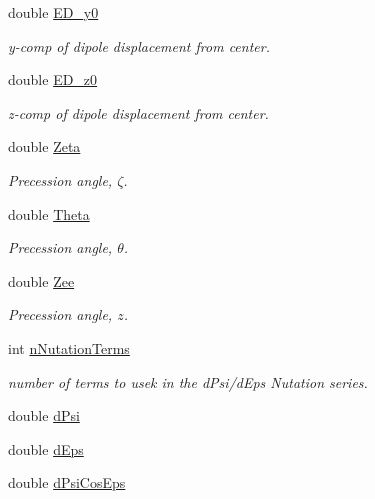\begin{CompactItemize}
double \hyperlink{struct_lgm___c_trans_0365c6b352177b9f923ea9f3dedd5163}{ED\_\-y0}
\begin{CompactList}\small\item\em y-comp of dipole displacement from center. \item\end{CompactList}\item 
double \hyperlink{struct_lgm___c_trans_2ef284be0af92b46e986d8842790143c}{ED\_\-z0}
\begin{CompactList}\small\item\em z-comp of dipole displacement from center. \item\end{CompactList}\item 
double \hyperlink{struct_lgm___c_trans_7e97ac28698cae83ebf4b304dbbae40a}{Zeta}
\begin{CompactList}\small\item\em Precession angle, $\zeta$. \item\end{CompactList}\item 
double \hyperlink{struct_lgm___c_trans_1f9ad133d6f1c336ecc4b50959393dde}{Theta}
\begin{CompactList}\small\item\em Precession angle, $\theta$. \item\end{CompactList}\item 
double \hyperlink{struct_lgm___c_trans_913357aae0e0cb66e4bae0969b0855c4}{Zee}
\begin{CompactList}\small\item\em Precession angle, $z$. \item\end{CompactList}\item 
int \hyperlink{struct_lgm___c_trans_dc45647f0571d420274eddb4f11aa358}{nNutationTerms}
\begin{CompactList}\small\item\em number of terms to usek in the dPsi/dEps Nutation series. \item\end{CompactList}\item 
double \hyperlink{struct_lgm___c_trans_bdbb574b7039f3276386228756be3072}{dPsi}
\item 
double \hyperlink{struct_lgm___c_trans_da0088f7b27e9da12e8e3bf8e9cf61b7}{dEps}
\item 
double \hyperlink{struct_lgm___c_trans_294c5492f2739575636f91a5170f9b19}{dPsiCosEps}

\end{CompactItemize}
